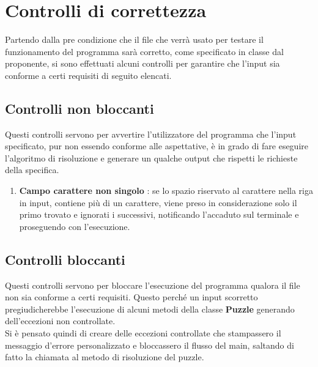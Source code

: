 % 
%
%
%

\section{Controlli di correttezza}
Partendo dalla pre condizione che il file che verrà usato per testare il funzionamento del programma sarà corretto, come specificato in classe dal proponente, si sono effettuati alcuni controlli per garantire che l'input sia conforme a certi requisiti di seguito elencati.

	\subsection{Controlli non bloccanti}
Questi controlli servono per avvertire l'utilizzatore del programma che l'input specificato, pur non essendo conforme alle aspettative, è in grado di fare eseguire l'algoritmo di risoluzione e generare un qualche output che rispetti le richieste della specifica.
		\begin{enumerate}
			\item \textbf{Campo carattere non singolo} : se lo spazio riservato al carattere nella riga in input, contiene più di un carattere, viene preso in considerazione solo il primo trovato e ignorati i successivi, notificando l'accaduto sul terminale e proseguendo con l'esecuzione.
		\end{enumerate}
		
	\subsection{Controlli bloccanti}
Questi controlli servono per bloccare l'esecuzione del programma qualora il file non sia conforme a certi requisiti. Questo perché un input scorretto pregiudicherebbe l'esecuzione di alcuni metodi della classe \textbf{Puzzle} generando dell'eccezioni non controllate. \\
Si è pensato quindi di creare delle eccezioni controllate che stampassero il messaggio d'errore personalizzato e bloccassero il flusso del main, saltando di fatto la chiamata al metodo di risoluzione del puzzle. \\

